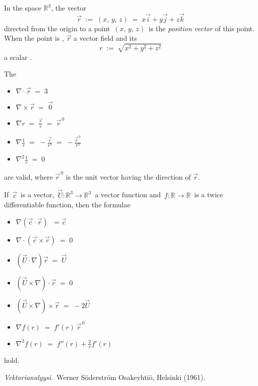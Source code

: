 \documentclass[12pt]{article}
\theoremstyle{definition}
\begin{document}
In the space $\mathbb{R}^3$, the vector 
$$\vec{r} \;:=\; (x,\,y,\,z) \;=\; x\vec{i}+y\vec{j}+z\vec{k}$$
directed from the origin to a point \,$(x,\,y,\,z)$\, is the {\em position vector} of this point.  When the point is , $\vec{r}$  a vector field and its 
$$r \;:=\; \sqrt{x^2\!+\!y^2\!+\!z^2}$$
a scalar .

The 
\begin{itemize}
\item $\nabla\!\cdot\vec{r} \;=\; 3$
\item $\nabla\!\times\!\vec{r} \;=\; \vec{0}$
\item $\displaystyle\nabla r \;=\; \frac{\vec{r}}{r} \;=\; \vec{r}^{\,0}$
\item $\displaystyle\nabla\frac{1}{r} \;=\; -\frac{\vec{r}}{r^3} \;=\; -\frac{\vec{r}^{\,0}}{r^2}$
\item $\displaystyle\nabla^2\frac{1}{r} \;=\; 0$
\end{itemize}
are valid, where $\vec{r}^{\,0}$ is the unit vector having the direction of $\vec{r}$.

If\, $\vec{c}$\, is a  vector,\, $\vec{U}\!\!:\mathbb{R}^3\to\mathbb{R}^3$\, a vector function and\, $f\!\!:\mathbb{R}\to\mathbb{R}$\, is a twice differentiable function, then the formulae
\begin{itemize}
\item $\nabla(\vec{c}\cdot\!\vec{r})\; \;= \vec{c}$
\item $\nabla\cdot(\vec{c}\times\vec{r}) \;=\; 0$
\item $(\vec{U}\!\cdot\!\nabla)\vec{r} \;=\; \vec{U}$
\item $(\vec{U}\!\times\!\nabla)\!\cdot\!\vec{r} \;=\; 0$
\item $(\vec{U}\!\times\!\nabla)\!\times\!\vec{r} \;=\; -2\vec{U}$
\item $\nabla f(r) \;=\; f'(r)\,\vec{r}^{\,0}$
\item $\displaystyle\nabla^2f(r) \;=\; f''(r)\!+\frac{2}{r}f'(r)$
\end{itemize}
hold.

\begin{thebibliography}{9}
 {\em Vektorianalyysi}. \,Werner S\"oderstr\"om Osakeyhti\"o, Helsinki (1961).
\end{thebibliography}
\end{document}
